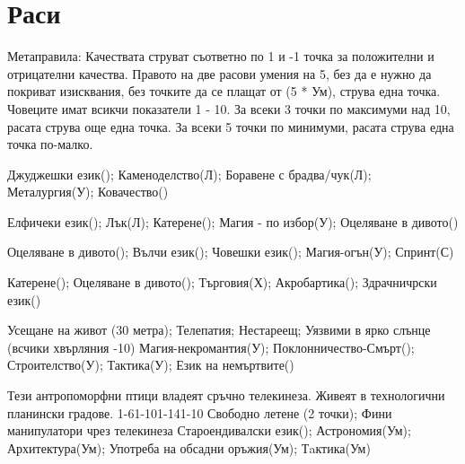 \section{Раси}
Метаправила:
Качествата струват съответно по 1 и -1 точка за положителни и отрицателни качества.
Правото на две расови умения на 5, без да е нужно да покриват изисквания, без точките да се плащат от (5 * Ум), струва една точка.
Човеците имат всикчи показатели 1 - 10.
За всеки 3 точки по максимуми над 10, расата струва още една точка.
За всеки 5 точки по минимуми, расата струва една точка по-малко.
\\
\begin{multicols}{2}

{
Джуджешки език();
Каменоделство(Л);
Боравене с брадва/чук(Л);
Металургия(У);
Ковачество()
}

{
Елфичеки език();
Лък(Л);
Катерене();
Магия - по избор(У);
Оцеляване в дивото()
}

{
Оцеляване в дивото();
Вълчи език();
Човешки език();
Магия-огън(У);
Спринт(С)
}

{
Катерене();
Оцеляване в дивото();
Търговия(Х);
Акробартика();
Здрачничрски език()
}

{
Усещане на живот (30 метра);
Телепатия;
Нестареещ;
Уязвими в ярко слънце (всчики хвърляния -10)
}
{
Магия-некромантия(У);
Поклонничество-Смърт();
Строителство(У);
Тактика(У);
Език на немъртвите()
}

{Тези антропоморфни птици владеят сръчно телекинеза. Живеят в технологични планински градове.}
{1-6}{1-10}{1-14}{1-10}
{
Свободно летене (2 точки);
Фини манипулатори чрез телекинеза
}
{
Староендивалски език();
Астрономия(Ум);
Архитектура(Ум);
Употреба на обсадни оръжия(Ум);
Тaктика(Ум)
}

\end{multicols}
